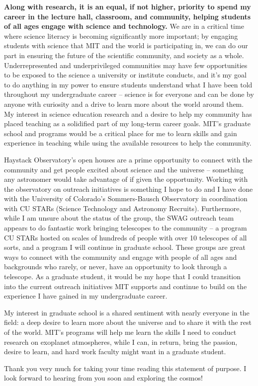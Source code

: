 \documentclass[11pt,letterpaper]{article}
\begin{document}
\textbf{Along with research, it is an equal, if not higher, priority to spend my career in the lecture hall, classroom, and community, helping students of all ages engage with science and technology.} We are in a critical time where science literacy is becoming significantly more important; by engaging students with science that MIT and the world is participating in, we can do our part in ensuring the future of the scientific community, and society as a whole. Underrepresented and underprivileged communities may have few opportunities to be exposed to the science a university or institute conducts, and it’s my goal to do anything in my power to ensure students understand what I have been told throughout my undergraduate career -- science is for everyone and can be done by anyone with curiosity and a drive to learn more about the world around them. My interest in science education research and a desire to help my community has placed teaching as a solidified part of my long-term career goals. MIT’s graduate school and programs would be a critical place for me to learn skills and gain experience in teaching while using the available resources to help the community.

Haystack Observatory’s open houses are a prime opportunity to connect with the community and get people excited about science and the universe -- something any astronomer would take advantage of if given the opportunity. Working with the observatory on outreach initiatives is something I hope to do and I have done with the University of Colorado’s Sommers-Bausch Observatory in coordination with CU STARs (Science Technology and Astronomy Recruits). Furthermore, while I am unsure about the status of the group, the SWAG outreach team appears to do fantastic work bringing telescopes to the community -- a program CU STARs hosted on scales of hundreds of people with over 10 telescopes of all sorts, and a program I will continue in graduate school. These groups are great ways to connect with the community and engage with people of all ages and backgrounds who rarely, or never, have an opportunity to look through a telescope. As a graduate student, it would be my hope that I could transition into the current outreach initiatives MIT supports and continue to build on the experience I have gained in my undergraduate career.

My interest in graduate school is a shared sentiment with nearly everyone in the field: a deep desire to learn more about the universe and to share it with the rest of the world. MIT’s programs will help me learn the skills I need to conduct research on exoplanet atmospheres, while I can, in return, bring the passion, desire to learn, and hard work faculty might want in a graduate student.

Thank you very much for taking your time reading this statement of purpose. I look forward to hearing from you soon and exploring the cosmos!
\end{document}
